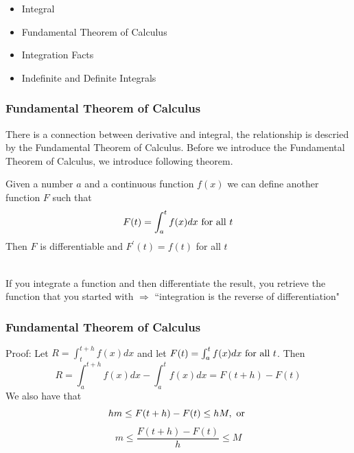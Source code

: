 \documentclass{beamer}
\numberwithin{equation}{section}
\begin{document}
\begin{frame}

\begin{itemize}
\item \textcolor{mygray}{Integral}
\item \textcolor{myblack}{Fundamental Theorem of Calculus}
\item \textcolor{mygray}{Integration Facts}
\item \textcolor{mygray}{Indefinite and Definite Integrals}
\end{itemize}

\end{frame}



\begin{frame}
\frametitle{Fundamental Theorem of Calculus}

There is a connection between derivative and integral, the relationship is descried by the Fundamental Theorem of Calculus. \pause Before we introduce the Fundamental Theorem of Calculus, we introduce following theorem.

\begin{theorem}
Given a number $a$ and a continuous function $f(x)$ we can define another function $F$ such that $$F(t)=\int_a^t f(x) dx \hbox{ for all } t$$
Then $F$ is differentiable and $F^\prime(t)=f(t)$ for all $t$
\end{theorem} \pause
 
\ \\If you integrate a function and then differentiate the result, you retrieve the function that you started with  $\Rightarrow$ ``integration is the reverse of differentiation"

\end{frame}



\begin{frame}
\frametitle{Fundamental Theorem of Calculus}

\begin{center}
\end{center}

Proof: Let $R=\int_t^{t+h}f(x) dx$ and let $F(t)=\int_a^t f(x) dx \hbox{ for all } t$. \pause Then $$R=\int_a^{t+h}f(x)dx-\int_a^{t}f(x)dx=F(t+h)-F(t)$$ \pause
We also have that $$ hm\leq F(t+h)-F(t)\leq hM, \hbox{ or }$$
$$m\leq \frac{F(t+h)-F(t)}{h}\leq M$$ 

\end{frame}
\end{document}
